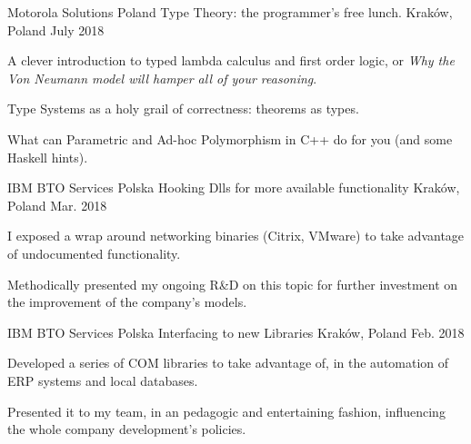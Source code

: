 
\begin{cventries}

\cventry
    {Motorola Solutions Poland} %
    {Type Theory: the programmer's free lunch.} %
    {Kraków, Poland} %
    {July 2018} %
    {
        \begin{cvitems} %
            \item {A clever introduction to typed lambda calculus and first order logic, or \textit{Why the Von Neumann model will hamper all of your reasoning}.}
            \item {Type Systems as a holy grail of correctness: theorems as types.}
            \item {What can Parametric and Ad-hoc Polymorphism in C++ do for you (and some Haskell hints).}
        \end{cvitems}
    }

  \cventry
    {IBM BTO Services Polska} %
    {Hooking Dlls for more available functionality} %
    {Kraków, Poland} %
    {Mar. 2018} %
    {
        \begin{cvitems} %
            \item {I exposed a wrap around networking binaries (Citrix, VMware) to take advantage of undocumented functionality.}
            \item {Methodically presented my ongoing R\&D on this topic for further investment on the improvement of the company's models.}
        \end{cvitems}
    }

  \cventry
    {IBM BTO Services Polska} %
    {Interfacing to new Libraries} %
    {Kraków, Poland} %
    {Feb. 2018} %
    {
        \begin{cvitems} %
            \item {Developed a series of COM libraries to take advantage of, in the automation of ERP systems and local databases.}
            \item {Presented it to my team, in an pedagogic and entertaining fashion, influencing the whole company development's policies.}
        \end{cvitems}
    }


\end{cventries}

